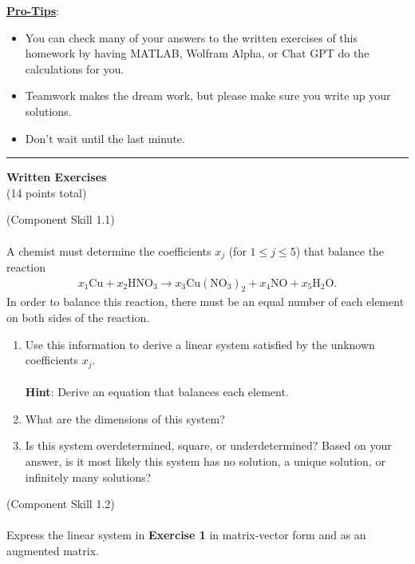 \documentclass[12pt]{article}
\newenvironment{exercise}[2][\large Exercise]{\begin{trivlist}
\item[\centering \Large \hskip \labelsep {\bfseries #1}\hskip \labelsep {\bfseries #2.}]}{\end{trivlist}}
\begin{document}
\underline{\textbf{Pro-Tips}}: \\ \begin{itemize} \item You can check many of your answers to the written exercises of this homework by having MATLAB, Wolfram Alpha, or Chat GPT do the calculations for you. \item Teamwork makes the dream work, but please make sure you write up your solutions. \item Don't wait until the last minute.  \smiley{} \\ \end{itemize} \clearpage
\hrule
\begin{center}\Large \textbf{Written Exercises} \\ \normalsize (14 points total) \normalsize \end{center} \vspace*{0.2cm}
\begin{exercise}{\large 1} {\large (Component Skill 1.1)} ~\\\\
A chemist must determine the coefficients $x_j$ (for $1 \leq j \leq 5$) that balance the reaction
\begin{align*}
  x_1 \textrm{Cu} + x_2 \textrm{HNO}_3 \rightarrow x_3\textrm{Cu}(\textrm{NO}_3)_2 + x_4 \textrm{NO} + x_5 \textrm{H}_2\textrm{O}.
\end{align*}
In order to balance this reaction, there must be an equal number of each element on both sides of the reaction. 
\begin{enumerate}
    \item  Use this information to derive a linear system satisfied by the unknown coefficients $x_j$. \\\\
    \textbf{Hint}: Derive an equation that balances each element.  \\
   
    \item What are the dimensions of this system? 
    
    \item Is this system overdetermined, square, or underdetermined? Based on your answer, is it most likely this system has no solution, a unique solution, or infinitely many solutions?
\end{enumerate}
\vspace{1cm}
\begin{exercise}{\large 2} {\large (Component Skill 1.2)} ~\\\\
Express the linear system in \textbf{Exercise 1} in matrix-vector form and as an augmented matrix.
\end{exercise}
\end{exercise} \vspace{1cm}
\end{document}
